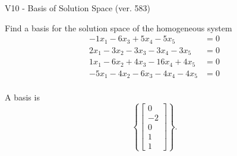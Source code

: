 \begin{exercise}
  \begin{exerciseTitle}V10 - Basis of Solution Space (ver. 583)\end{exerciseTitle}
  \begin{exerciseStatement}
    Find a basis for the solution space of the homogeneous system 
\begin{align*}
 -1 x_ 1 -6 x_ 3 + 5 x_ 4 -5 x_ 5 &= 0  \\ 
  2 x_ 1 -3 x_ 2 -3 x_ 3 -3 x_ 4 -3 x_ 5 &= 0  \\ 
  1 x_ 1 -6 x_ 2 + 4 x_ 3 -16 x_ 4 + 4 x_ 5 &= 0  \\ 
  -5 x_ 1 -4 x_ 2 -6 x_ 3 -4 x_ 4 -4 x_ 5 &= 0  \\ 
 \end{align*}


 
  \end{exerciseStatement}

  \begin{exerciseAnswer}
   A basis is   
\[\left\{\left[\begin{array}{c}
0 \\
-2 \\
0 \\
1 \\
1
\end{array}\right]\right\}.\]

  


  \end{exerciseAnswer}
\end{exercise}